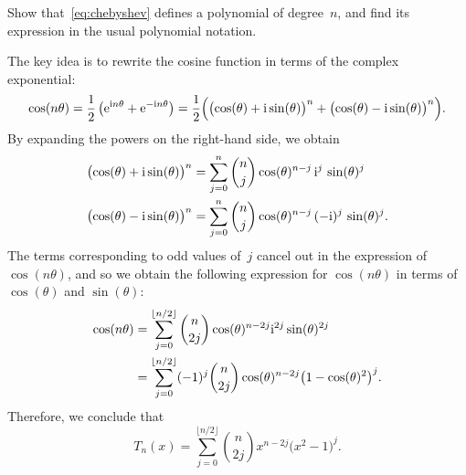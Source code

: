 \begin{exercise}
    \label{exercise:chebyshev}
    Show that~\eqref{eq:chebyshev} defines a polynomial of degree~$n$,
    and find its expression in the usual polynomial notation.
\end{exercise}
\begin{solution}
    The key idea is to rewrite the cosine function in terms of the complex exponential:
    \[
        \cos (n \theta) = \frac{1}{2}\left( \mathrm e^{\mathrm i n \theta} + \mathrm e^{-\mathrm i n \theta} \right)
            = \frac{1}{2}\Bigl( \bigl(\cos(\theta) + \mathrm i \sin (\theta)\bigr)^n + \bigl(\cos(\theta) - \mathrm i \sin (\theta)\bigr)^n \Bigr).
    \]
    By expanding the powers on the right-hand side,
    we obtain
    \begin{align*}
        \bigl( \cos (\theta) + \mathrm i \sin (\theta) \bigr)^n
        &= \sum_{j=0}^{n} \binom{n}{j} \cos(\theta)^{n-j}  \, \mathrm i^{j} \, \sin(\theta)^{j} \\
        \bigl( \cos (\theta) - \mathrm i \sin (\theta) \bigr)^n
        &= \sum_{j=0}^{n} \binom{n}{j} \cos(\theta)^{n-j}  \, (-\mathrm i)^{j} \, \sin(\theta)^{j}.
    \end{align*}
    The terms corresponding to odd values of~$j$ cancel out in the expression of $\cos(n \theta)$,
    and so we obtain the following expression for $\cos(n \theta)$ in terms of $\cos(\theta)$ and $\sin(\theta)$:
    \begin{align*}
        \cos (n \theta)
        &= \sum_{j=0}^{\lfloor n/2 \rfloor} \binom{n}{2j} \cos(\theta)^{n-2j}  \mathrm i^{2j} \sin(\theta)^{2j} \\
        &= \sum_{j=0}^{\lfloor n/2 \rfloor} (-1)^j \binom{n}{2j} \cos(\theta)^{n-2j}   \bigl(1 - \cos(\theta)^2\bigr)^j.
    \end{align*}
    Therefore,
    we conclude that
    \begin{equation}
        \label{eq:expression_chebyshev}
        T_n(x) = \sum_{j=0}^{\lfloor n/2 \rfloor} \binom{n}{2j} x^{n-2j}   \bigl(x^2 - 1\bigr)^j.
    \end{equation}
\end{solution}


